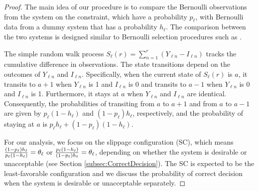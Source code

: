 \documentclass[11pt]{article}
\begin{document}
\begin{proof}
    \renewcommand{\qedsymbol}{}
    The main idea of our procedure is to compare the Bernoulli observations from the system on the constraint, which have a probability $p_\ell$, with Bernoulli data from a dummy system that has a probability $h_\ell$. The comparison between the two systems is designed similar to Bernoulli selection procedures such as \cite{tamhane1985some}. 


    The simple random walk process $S_\ell(r) = \sum_{n=1}^{r} \left(Y_{\ell n} - I_{\ell n}\right)$ tracks the cumulative difference in observations.
The state transitions depend on the outcomes of $Y_{\ell n}$ and $I_{\ell n}$. Specifically, when the current state of $S_\ell(r)$ is $a$, it transits to $a+1$ when $Y_{\ell n}$ is 1 and $I_{\ell n}$ is 0 and transits to $a-1$ when $Y_{\ell n}$ is 0 and $I_{\ell n}$ is 1. Furthermore, it stays at $a$ when $Y_{\ell n}$ and $I_{\ell n}$ are identical. Consequently, the probabilities of transiting from $a$ to $a+1$ and from $a$ to $a-1$ are given by $p_\ell(1-h_\ell)$ and $(1-p_\ell)h_\ell$, respectively, and the probability of staying at $a$ is $p_\ell h_\ell+(1-p_\ell)(1-h_\ell)$. 



For our analysis, we focus on the slippage configuration (SC), which means $
{(1-p_\ell)h_\ell \over p_\ell(1-h_\ell)} = \theta_\ell$ or $
{p_\ell (1-h_\ell) \over (1-p_\ell) h_\ell} = \theta_\ell$, depending on whether the system is desirable or unacceptable (see Section \ref{subsec:CorrectDecision}). The SC is expected to be the least-favorable configuration and we discuss the probability of correct decision when the system is desirable or unacceptable separately. 


\end{proof}
\end{document}
